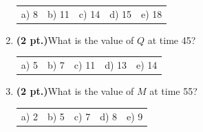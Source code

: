 \documentclass{article}
\begin{document}
\begin{enumerate}
\begin{tabular}{p{0.6in} p{0.6in} p{0.6in} p{0.6in} l}
a) 8  & b) 11  & c) 14 & d) 15  & e) 18
\end{tabular}

\item {\bf (2 pt.)}What is the value of $Q$ at time 45?

\begin{tabular}{p{0.6in} p{0.6in} p{0.6in} p{0.6in} l}
a) 5  & b) 7  & c) 11 & d) 13  & e) 14
\end{tabular}

\item {\bf (2 pt.)}What is the value of $M$ at time 55?

\begin{tabular}{p{0.6in} p{0.6in} p{0.6in} p{0.6in} l}
a) 2  & b) 5  & c) 7 & d) 8  & e) 9
\end{tabular}

\end{enumerate}
\end{document}
